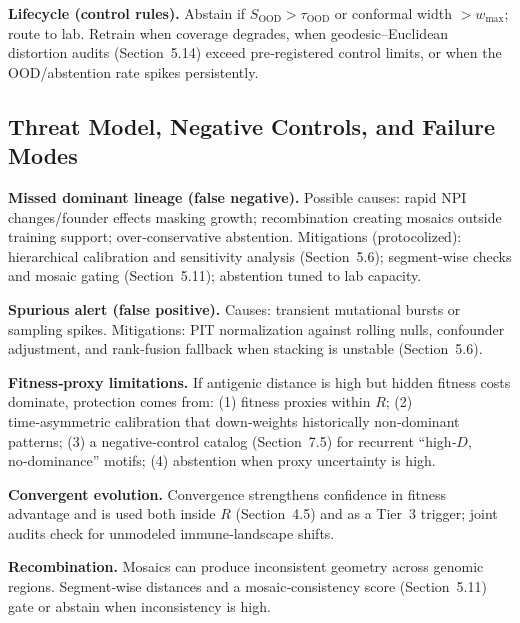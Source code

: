 \documentclass[11pt]{article}
\begin{document}
\textbf{Lifecycle (control rules).} Abstain if $S_{\text{OOD}}>\tau_{\text{OOD}}$ or conformal width $>w_{\max}$; route to lab. Retrain when coverage degrades, when geodesic--Euclidean distortion audits (Section~5.14) exceed pre‑registered control limits, or when the OOD/abstention rate spikes persistently.

\subsection{Threat Model, Negative Controls, and Failure Modes}
\label{sec:threats}
\textbf{Missed dominant lineage (false negative).} Possible causes: rapid NPI changes/founder effects masking growth; recombination creating mosaics outside training support; over‑conservative abstention. Mitigations (protocolized): hierarchical calibration and sensitivity analysis (Section~5.6); segment‑wise checks and mosaic gating (Section~5.11); abstention tuned to lab capacity.

\textbf{Spurious alert (false positive).} Causes: transient mutational bursts or sampling spikes. Mitigations: PIT normalization against rolling nulls, confounder adjustment, and rank‑fusion fallback when stacking is unstable (Section~5.6).

\textbf{Fitness‑proxy limitations.} If antigenic distance is high but hidden fitness costs dominate, protection comes from: (1) fitness proxies within $R$; (2) time‑asymmetric calibration that down‑weights historically non‑dominant patterns; (3) a negative‑control catalog (Section~7.5) for recurrent “high‑$D$, no‑dominance” motifs; (4) abstention when proxy uncertainty is high.

\textbf{Convergent evolution.} Convergence strengthens confidence in fitness advantage and is used both inside $R$ (Section~4.5) and as a Tier 3 trigger; joint audits check for unmodeled immune‑landscape shifts.

\textbf{Recombination.} Mosaics can produce inconsistent geometry across genomic regions. Segment‑wise distances and a mosaic‑consistency score (Section~5.11) gate or abstain when inconsistency is high.
\end{document}
